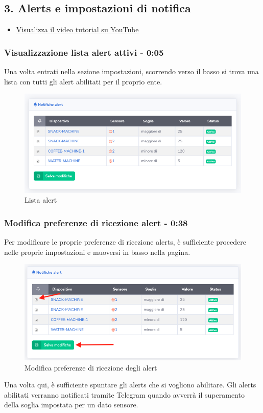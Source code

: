 \newpage \subsection{3. Alerts e impostazioni di notifica}

	\begin{itemize}
		\item \href{https://www.youtube.com/watch?v=PjySMOLCtMA&list=PLPKYjnuIh1FA3b3jn_bwY_ztYzaFn2mIT&index=6}{Visualizza il video tutorial su YouTube} 
	\end{itemize}

	\subsubsection{Visualizzazione lista alert attivi - 0:05}
	Una volta entrati nella sezione impostazioni, scorrendo verso il basso si trova una lista con tutti gli alert abilitati per il proprio ente.
		\begin{figure}[H]
		\centering
		\includegraphics[scale=0.600]{res/images/membro/listaAlert.png}
		\caption{Lista alert}
	\end{figure}

	\subsubsection{Modifica preferenze di ricezione alert - 0:38}
		Per modificare le proprie preferenze di ricezione alerts, è sufficiente procedere nelle proprie impostazioni e muoversi in basso nella pagina.
		\begin{figure}[H]
		\centering
		\includegraphics[scale=0.600]{res/images/membro/attDisattAlert.png}
		\caption{Modifica preferenze di ricezione degli alert}
	\end{figure}
	Una volta qui, è sufficiente spuntare gli alerts che si vogliono abilitare. Gli alerts abilitati verranno notificati tramite Telegram quando avverrà il superamento della soglia impostata per un dato sensore.


